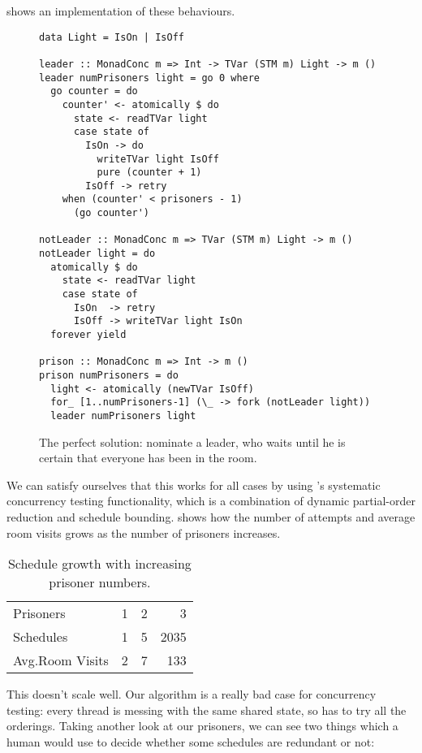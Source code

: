  shows an implementation of these behaviours.

\begin{figure}[t]
  \centering
  \begin{lstlisting}
data Light = IsOn | IsOff

leader :: MonadConc m => Int -> TVar (STM m) Light -> m ()
leader numPrisoners light = go 0 where
  go counter = do
    counter' <- atomically $ do
      state <- readTVar light
      case state of
        IsOn -> do
          writeTVar light IsOff
          pure (counter + 1)
        IsOff -> retry
    when (counter' < prisoners - 1)
      (go counter')

notLeader :: MonadConc m => TVar (STM m) Light -> m ()
notLeader light = do
  atomically $ do
    state <- readTVar light
    case state of
      IsOn  -> retry
      IsOff -> writeTVar light IsOn
  forever yield

prison :: MonadConc m => Int -> m ()
prison numPrisoners = do
  light <- atomically (newTVar IsOff)
  for_ [1..numPrisoners-1] (\_ -> fork (notLeader light))
  leader numPrisoners light
  \end{lstlisting}
  \caption{The perfect solution: nominate a leader, who waits until he is certain that everyone has been in the room.}
  \label{fig:100perfect}
\end{figure}

We can satisfy ourselves that this works for all cases by using
\dejafu{}'s systematic concurrency testing functionality, which is a
combination of dynamic partial-order reduction and schedule bounding.
 shows how the number of attempts and average room
visits grows as the number of prisoners increases.

\begin{table}[t]
  \centering
  \begin{tabular}{l|rrr} \toprule
    Prisoners          & 1 & 2 &    3 \\
    Schedules          & 1 & 5 & 2035 \\
    Avg.\@ Room Visits & 2 & 7 &  133 \\ \bottomrule
  \end{tabular}
  \caption{Schedule growth with increasing prisoner numbers.}\label{tbl:100slow}
\end{table}

This doesn't scale well.  Our algorithm is a really bad case for
concurrency testing: every thread is messing with the same shared
state, so \dejafu{} has to try all the orderings.  Taking another look
at our prisoners, we can see two things which a human would use to
decide whether some schedules are redundant or not:

